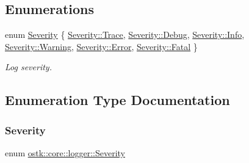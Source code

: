 \subsection*{Enumerations}
\begin{DoxyCompactItemize}
\item 
enum \hyperlink{namespaceostk_1_1core_1_1logger_a52d02954e094391f067befffe7f3cae9}{Severity} \{ \newline
\hyperlink{namespaceostk_1_1core_1_1logger_a52d02954e094391f067befffe7f3cae9add4ec0ac4e58f7c32a01244ae91150b1}{Severity\+::\+Trace}, 
\hyperlink{namespaceostk_1_1core_1_1logger_a52d02954e094391f067befffe7f3cae9aa603905470e2a5b8c13e96b579ef0dba}{Severity\+::\+Debug}, 
\hyperlink{namespaceostk_1_1core_1_1logger_a52d02954e094391f067befffe7f3cae9a4059b0251f66a18cb56f544728796875}{Severity\+::\+Info}, 
\hyperlink{namespaceostk_1_1core_1_1logger_a52d02954e094391f067befffe7f3cae9a0eaadb4fcb48a0a0ed7bc9868be9fbaa}{Severity\+::\+Warning}, 
\newline
\hyperlink{namespaceostk_1_1core_1_1logger_a52d02954e094391f067befffe7f3cae9a902b0d55fddef6f8d651fe1035b7d4bd}{Severity\+::\+Error}, 
\hyperlink{namespaceostk_1_1core_1_1logger_a52d02954e094391f067befffe7f3cae9a882384ec38ce8d9582b57e70861730e4}{Severity\+::\+Fatal}
 \}\begin{DoxyCompactList}\small\item\em Log severity. \end{DoxyCompactList}
\end{DoxyCompactItemize}


\subsection{Enumeration Type Documentation}
\mbox{\label{namespaceostk_1_1core_1_1logger_a52d02954e094391f067befffe7f3cae9}} 
\subsubsection{\texorpdfstring{Severity}{Severity}}
{\footnotesize\ttfamily enum \hyperlink{namespaceostk_1_1core_1_1logger_a52d02954e094391f067befffe7f3cae9}{ostk\+::core\+::logger\+::\+Severity}\hspace{0.3cm}{\ttfamily [strong]}}



